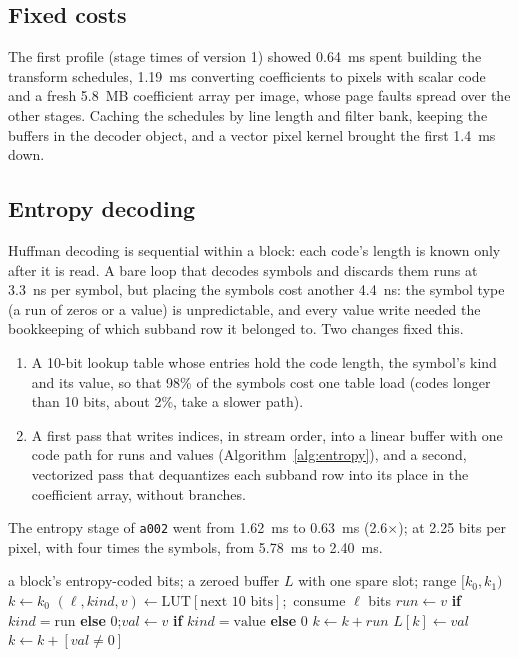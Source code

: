 \subsection{Fixed costs}

The first profile (stage times of version 1) showed 0.64~ms spent building the transform
schedules, 1.19~ms converting coefficients to pixels with scalar code and a fresh 5.8~MB
coefficient array per image, whose page faults spread over the other stages. Caching the
schedules by line length and filter bank, keeping the buffers in the decoder object, and a
vector pixel kernel brought the first 1.4~ms down.

\subsection{Entropy decoding}

Huffman decoding is sequential within a block: each code's length is known only after it is
read. A bare loop that decodes symbols and discards them runs at 3.3~ns per symbol, but placing
the symbols cost another 4.4~ns: the symbol type (a run of zeros or a value) is unpredictable,
and every value write needed the bookkeeping of which subband row it belonged to. Two changes
fixed this.
\begin{enumerate}
  \item A 10-bit lookup table whose entries hold the code length, the symbol's kind and its
    value, so that 98\% of the symbols cost one table load (codes longer than 10 bits, about
    2\%, take a slower path).
  \item A first pass that writes indices, in stream order, into a linear buffer with one code
    path for runs and values (Algorithm~\ref{alg:entropy}), and a second, vectorized pass that
    dequantizes each subband row into its place in the coefficient array, without branches.
\end{enumerate}
The entropy stage of \texttt{a002} went from 1.62~ms to 0.63~ms (2.6$\times$); at 2.25 bits per
pixel, with four times the symbols, from 5.78~ms to 2.40~ms.

\begin{algorithm}[ht]
  \caption{Branch-free placement of decoded symbols.}
  \label{alg:entropy}
  \begin{algorithmic}[1]
    \Require a block's entropy-coded bits; a zeroed buffer $L$ with one spare slot; range $[k_0, k_1)$
    \State $k \gets k_0$
      \State $(\ell, \mathit{kind}, v) \gets \mathrm{LUT}[\text{next 10 bits}]$;\ consume $\ell$ bits 
      \State $\mathit{run} \gets v$ \textbf{if} $\mathit{kind} = \text{run}$ \textbf{else} $0$;\quad $\mathit{val} \gets v$ \textbf{if} $\mathit{kind} = \text{value}$ \textbf{else} $0$
      \State $k \gets k + \mathit{run}$
      \State $L[k] \gets \mathit{val}$ 
      \State $k \gets k + [\mathit{val} \ne 0]$
    \EndWhile
  \end{algorithmic}
\end{algorithm}

